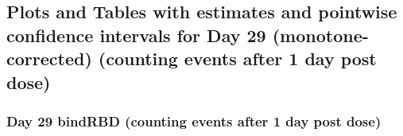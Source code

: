 \documentclass[]{article}
\begin{document}
\clearpage
\clearpage

\hypertarget{plots-and-tables-with-estimates-and-pointwise-confidence-intervals-for-day-29-monotone-corrected-counting-events-after-1-day-post-dose}{%
\subsection{Plots and Tables with estimates and pointwise confidence
intervals for Day 29 (monotone-corrected) (counting events after 1 day
post
dose)}\label{plots-and-tables-with-estimates-and-pointwise-confidence-intervals-for-day-29-monotone-corrected-counting-events-after-1-day-post-dose}}

\clearpage

\hypertarget{day-29-bindrbd-counting-events-after-1-day-post-dose-1}{%
\subsubsection{Day 29 bindRBD (counting events after 1 day post
dose)}\label{day-29-bindrbd-counting-events-after-1-day-post-dose-1}}
\end{document}
